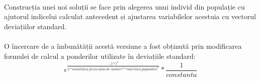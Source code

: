 \paragraph{}
Construcția unei noi soluții se face prin alegerea unui individ din populație cu ajutorul indicelui calculat antecedent și ajustarea variabilelor acestuia cu vectorul deviațiilor standard.
\paragraph{}
O încercare de a îmbunătății acestă versiune a fost obținută prin modificarea formulei de calcul a ponderilor utilizate în deviațiile standard:
\begin{equation}
    \epsilon^{\frac{-1*i^2}{2*localitatea\ procesului\ de\ cautare^2*marimea\ populatiei^2}}*\frac{1}{constanta}
\end{equation}
